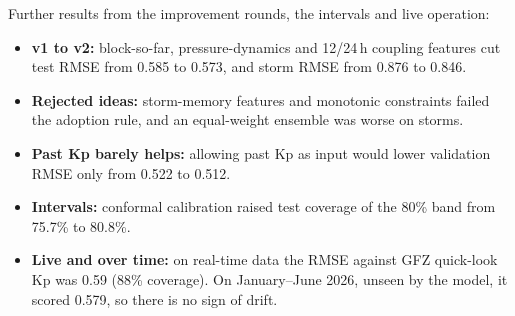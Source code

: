 \documentclass[11pt,a4paper]{article}
\begin{document}
Further results from the improvement rounds, the intervals and live operation:
\begin{itemize}
\item \textbf{v1 to v2:} block-so-far, pressure-dynamics and 12/24\,h coupling features cut test RMSE from 0.585
to 0.573, and storm RMSE from 0.876 to 0.846.
\item \textbf{Rejected ideas:} storm-memory features and monotonic constraints failed the adoption rule, and an
equal-weight ensemble was worse on storms.
\item \textbf{Past Kp barely helps:} allowing past Kp as input would lower validation RMSE only from 0.522 to 0.512.
\item \textbf{Intervals:} conformal calibration raised test coverage of the 80\% band from 75.7\% to 80.8\%.
\item \textbf{Live and over time:} on real-time data the RMSE against GFZ quick-look Kp was 0.59 (88\% coverage).
On January--June 2026, unseen by the model, it scored 0.579, so there is no sign of drift.
\end{itemize}
\end{document}
